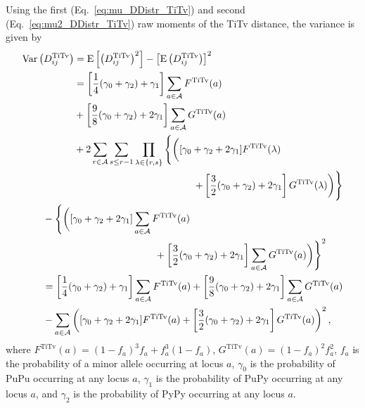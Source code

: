 \documentclass[aos]{imsart}
\begin{document}
Using the first (Eq.~\ref{eq:mu_DDistr_TiTv}) and second (Eq.~\ref{eq:mu2_DDistr_TiTv}) raw moments of the TiTv distance, the variance is given by
%
\begin{equation}\label{eq:var_DDistr_TiTv}
\begin{split}
\begin{aligned}
\text{Var}\left(D^\text{TiTv}_{ij}\right) &= \text{E}\left[\left(D^\text{TiTv}_{ij}\right)^2\right] - \left[\text{E}\left(D^\text{TiTv}_{ij}\right)\right]^2 \\
&=\left[\frac{1}{4}(\gamma_0 + \gamma_2) + \gamma_1\right] \sum_{a \in \mathcal{A}} F^\text{TiTv}(a) \\
&+ \left[\frac{9}{8}(\gamma_0 + \gamma_2) + 2\gamma_1\right] \sum_{a \in \mathcal{A}} G^\text{TiTv}(a)\\
&+ 2 \sum_{r \in \mathcal{A}} \sum_{s \leq r - 1} \prod_{\lambda \in \{r,s\}} {\Biggl\{}{\biggl(}[\gamma_0 + \gamma_2 + 2\gamma_1] F^\text{TiTv}(\lambda)\hphantom{space space spa}
\end{aligned}\\
+ \left[\frac{3}{2}(\gamma_0 + \gamma_2) + 2\gamma_1\right] G^\text{TiTv}(\lambda){\biggr)}{\Biggr\}} \\
\begin{aligned}
&- {\Biggl\{}{\biggl(}[\gamma_0 + \gamma_2 + 2\gamma_1] \sum_{a \in \mathcal{A}} F^\text{TiTv}(a) \\
&\hspace{4cm}+ \left[\frac{3}{2}(\gamma_0 + \gamma_2) + 2\gamma_1\right] \sum_{a \in \mathcal{A}} G^\text{TiTv}(a){\biggr)}{\Biggr\}}^2 \\
&=\left[\frac{1}{4}(\gamma_0 + \gamma_2) + \gamma_1\right] \sum_{a \in \mathcal{A}} F^\text{TiTv}(a) + \left[\frac{9}{8}(\gamma_0 + \gamma_2) + 2\gamma_1\right] \sum_{a \in \mathcal{A}} G^\text{TiTv}(a) \\
&- \sum_{a \in \mathcal{A}} \left([\gamma_0 + \gamma_2 + 2\gamma_1] F^\text{TiTv}(a) + \left[\frac{3}{2}(\gamma_0 + \gamma_2) + 2\gamma_1\right] G^\text{TiTv}(a)\right)^2,
\end{aligned}
\end{split}
\end{equation}
%
where $F^\text{TiTv}(a) = (1 - f_a)^3 f_a + f^3_a (1 - f_a)$, $G^\text{TiTv}(a) = (1 - f_a)^2 f^2_a$, $f_a$ is the probability of a minor allele occurring at locus $a$, $\gamma_0$ is the probability of PuPu occurring at any locus $a$, $\gamma_1$ is the probability of PuPy occurring at any locus $a$, and $\gamma_2$ is the probability of PyPy occurring at any locus $a$.
\end{document}

